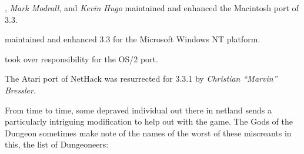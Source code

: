 \medskip
{}, {\it Mark Modrall}, and {\it Kevin Hugo} maintained and
enhanced the Macintosh port of 3.3.

\medskip
{} maintained and enhanced 3.3 for the Microsoft Windows NT platform.

\medskip
{} took over responsibility for the OS/2 port.

\medskip
\nd The Atari port of NetHack was resurrected for 3.3.1 by {\it Christian
``Marvin'' Bressler}.

\bigskip
\nd From time to time, some depraved individual out there in netland sends a
particularly intriguing modification to help out with the game.  The Gods of
the Dungeon sometimes make note of the names of the worst of these miscreants
in this, the list of Dungeoneers:

